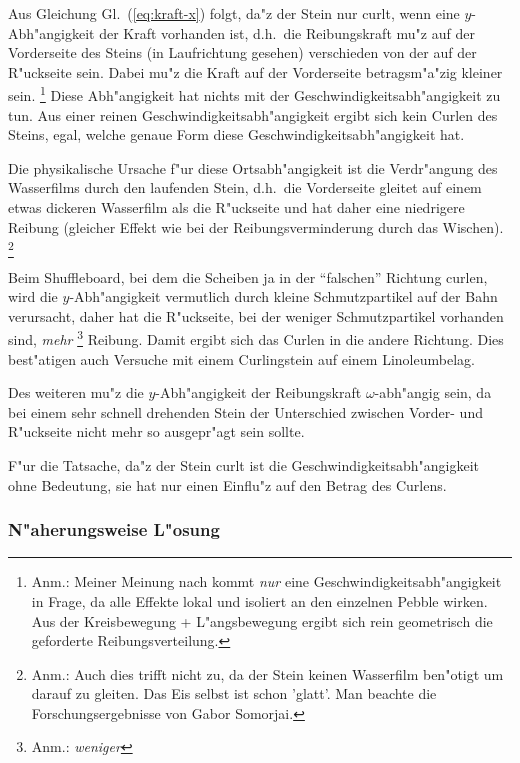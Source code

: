 \documentclass[a4paper]{report}
\newcommand{\eqref}[1]{Gl.~(\ref{eq:#1})}
\begin{document}
Aus Gleichung \eqref{kraft-x} folgt, da"z der Stein nur curlt, wenn eine
$ y $-Abh"angigkeit der Kraft vorhanden ist, d.h.\ die Reibungskraft mu"z auf der
Vorderseite des Steins (in Laufrichtung gesehen) verschieden von der auf der
R"uckseite sein. Dabei mu"z die Kraft auf der Vorderseite betragsm"a"zig kleiner
sein.
\footnote{Anm.: Meiner Meinung nach kommt \emph{nur} eine
Geschwindigkeitsabh"angigkeit in Frage, da alle Effekte lokal und
isoliert an den einzelnen Pebble wirken. Aus der Kreisbewegung +
L"angsbewegung ergibt sich rein geometrisch die geforderte
Reibungsverteilung.}
Diese Abh"angigkeit hat nichts mit der Geschwindigkeitsabh"angigkeit zu
tun. Aus einer reinen Geschwindigkeitsabh"angigkeit ergibt sich kein Curlen des
Steins, egal, welche genaue Form diese Geschwindigkeitsabh"angigkeit hat.

Die physikalische Ursache f"ur diese Ortsabh"angigkeit ist die Verdr"angung des
Wasserfilms durch den laufenden Stein, d.h.\ die Vorderseite gleitet auf einem
etwas dickeren Wasserfilm als die R"uckseite und hat daher eine niedrigere
Reibung (gleicher Effekt wie bei der Reibungsverminderung durch das
Wischen).%
\footnote{Anm.: Auch dies trifft nicht zu, da der Stein keinen
Wasserfilm ben"otigt um darauf zu gleiten. Das Eis selbst ist schon
'glatt'. Man beachte die Forschungsergebnisse von Gabor Somorjai.}

Beim Shuffleboard, bei dem die Scheiben ja in der "`falschen"' Richtung curlen,
wird die $ y $-Abh"angigkeit vermutlich durch kleine Schmutzpartikel auf der Bahn
verursacht, daher hat die R"uckseite, bei der weniger Schmutzpartikel vorhanden
sind, \emph{mehr}%
\footnote{Anm.: \emph{weniger}}
Reibung. Damit ergibt sich das Curlen in die andere Richtung. Dies best"atigen
auch Versuche mit einem Curlingstein auf einem Linoleumbelag. 

Des weiteren mu"z die $ y $-Abh"angigkeit der Reibungskraft $ \omega $-abh"angig
sein, da bei einem sehr schnell drehenden Stein der Unterschied zwischen Vorder-
und R"uckseite nicht mehr so ausgepr"agt sein sollte.

F"ur die Tatsache, da"z der Stein curlt ist die Geschwindigkeitsabh"angigkeit
ohne Bedeutung, sie hat nur einen Einflu"z auf den Betrag des Curlens.

\subsubsection{N"aherungsweise L"osung}
\end{document}
